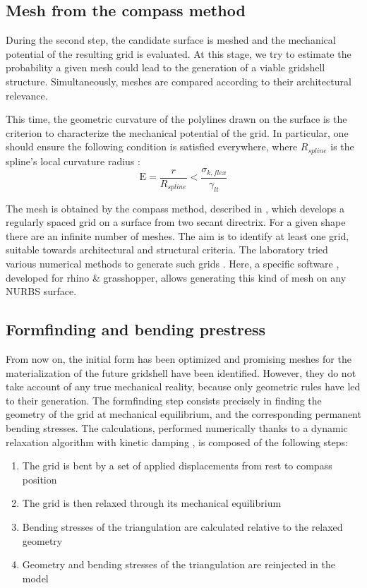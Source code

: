 \subsection{Mesh from the compass method}
During the second step, the candidate surface is meshed and the mechanical potential of the resulting grid is evaluated. At this stage, we try to estimate the probability a given mesh could lead to the generation of a viable gridshell structure. Simultaneously, meshes are compared according to their architectural relevance.

This time, the geometric curvature of the polylines drawn on the surface is the criterion to characterize the mechanical potential of the grid. In particular, one should ensure the following condition is satisfied everywhere, where $R_{spline}$ is the spline’s local curvature radius :
\begin{equation}
\mathrm{E} =  \frac{r}{R_{spline}}  <   \frac{\sigma_{k,flex}}{\gamma_{lt}}
\end{equation}

The mesh is obtained by the compass method, described in \citep{Otto1974}, which develops a regularly spaced grid on a surface from two secant directrix. For a given shape there are an infinite number of meshes. The aim is to identify at least one grid, suitable towards architectural and structural criteria. The laboratory tried various numerical methods to generate such grids \citep{Bouhaya2009}. Here, a specific software \citep{DuPeloux2011}, developed for rhino \& grasshopper, allows generating this kind of mesh on any NURBS surface.


\subsection{Formfinding and bending prestress}
From now on, the initial form has been optimized and promising meshes for the materialization of the future gridshell have been identified. However, they do not take account of any true mechanical reality, because only geometric rules have led to their generation. The formfinding step consists precisely in finding the geometry of the grid at mechanical equilibrium, and the corresponding permanent bending stresses.
The calculations, performed numerically thanks to a dynamic relaxation algorithm with kinetic damping \citep{Barnes1975}, is composed of the following steps:
\begin{enumerate}
\item The grid is bent by a set of applied displacements from rest to compass position
\item The grid is then relaxed through its mechanical equilibrium
\item Bending stresses of the triangulation are calculated relative to the relaxed geometry
\item Geometry and bending stresses of the triangulation are reinjected in the model
\end{enumerate}

